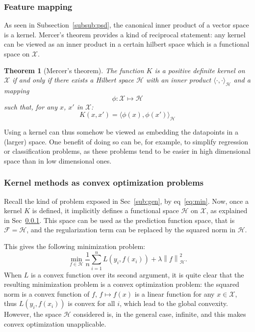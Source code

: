 \documentclass[a4paper, 11pt]{article}
\newtheorem{theorem}{Theorem}
\newcommand{\X}{\mathcal{X}}
\newcommand{\F}{\mathcal{F}}
\newcommand{\Hilb}{\mathcal{H}}
\newcommand{\x}{x_i}
\newcommand{\y}{y_i}
\newcommand{\normh}[1]{\left\| #1 \right\|_\Hilb}
\begin{document}
\subsubsection{Feature mapping}
\label{subsub:map}
As seen in Subsection~\ref{subsub:psd}, the canonical inner
product of a vector space is a kernel. Mercer's theorem provides
a kind of reciprocal statement: any kernel can be viewed as an
inner product in a certain hilbert space which is a functional
space on $\mathcal{X}$.
\begin{theorem} [Mercer's theorem]
The function $K$ is a positive definite kernel on $\mathcal{X}$ if and only
if there exists a Hilbert space $\mathcal{H}$ with an inner product $\langle
\cdot,\cdot\rangle_{\mathcal{H}}$ and a mapping
\begin{equation}
  \phi: \mathcal{X}\mapsto\mathcal{H}
\end{equation}
such that, for any $x$, $x'$ in $\mathcal{X}$:
\begin{equation}
  K(x,x') = \langle\phi(x),\phi(x')\rangle_{\mathcal{H}}
\end{equation}
\end{theorem}
Using a kernel can thus somehow be viewed as embedding the datapoints in
a (larger) space. One benefit of doing so can be, for example, to simplify
regression or classification problems, as these problems tend to
be easier in high dimensional space than in low dimensional ones.

\subsubsection{Kernel methods as convex optimization problems}
Recall the kind of problem exposed in Sec~\ref{sub:gen}, by eq~\ref{eq:min}.
Now, once a kernel $K$ is defined, it implicitly defines a functional space $\Hilb$ on $\X$, as
explained in Sec~\ref{subsub:map}. This space can be used as the prediction function space,
that is $\F = \Hilb$, and the regularization term can be replaced by the squared norm in $\Hilb$.

This gives the following minimization problem:
\begin{equation}
  \min\limits_{f\in\Hilb} \frac{1}{n}\sum\limits_{i=1}^nL(\y,f(\x)) + \lambda\normh{f}^2.
  \label{eq:minkernel}
\end{equation}
When $L$ is a convex function over its second argument, it is quite clear that the resulting minimization problem is
a convex optimization problem: the squared norm is a convex function of $f$, $f \mapsto f(x)$
is a linear function for any $x \in \X$, thus $L(\y,f(\x))$ is convex for all $i$, which lead
to the global convexity. However, the space $\Hilb$ considered is, in the general case, infinite,
and this makes convex optimization unapplicable.
\end{document}
